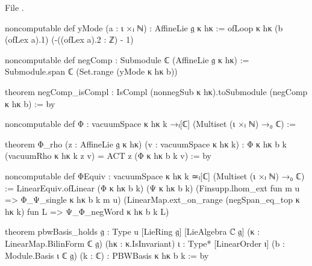File .
\begin{leancode}
noncomputable def yMode (a : ι ×ₗ ℕ) : AffineLie 𝔤 κ hκ :=
  ofLoop κ hκ (b (ofLex a).1) (-((ofLex a).2 : ℤ) - 1)

noncomputable def negComp : Submodule ℂ (AffineLie 𝔤 κ hκ) :=
  Submodule.span ℂ (Set.range (yMode κ hκ b))

theorem negComp_isCompl : IsCompl (nonnegSub κ hκ).toSubmodule (negComp κ hκ b) := by

noncomputable def Φ : vacuumSpace κ hκ k →ₗ[ℂ] (Multiset (ι ×ₗ ℕ) →₀ ℂ) :=

theorem Φ_rho (z : AffineLie 𝔤 κ hκ) (v : vacuumSpace κ hκ k) :
    Φ κ hκ b k (vacuumRho κ hκ k z v) = ACT z (Φ κ hκ b k v) := by

noncomputable def ΦEquiv : vacuumSpace κ hκ k ≃ₗ[ℂ] (Multiset (ι ×ₗ ℕ) →₀ ℂ) :=
  LinearEquiv.ofLinear (Φ κ hκ b k) (Ψ κ hκ b k)
    (Finsupp.lhom_ext fun m u => Φ_Ψ_single κ hκ b k m u)
    (LinearMap.ext_on_range (negSpan_eq_top κ hκ k) fun L => Ψ_Φ_negWord κ hκ b k L)

theorem pbwBasis_holds {𝔤 : Type u} [LieRing 𝔤] [LieAlgebra ℂ 𝔤]
    (κ : LinearMap.BilinForm ℂ 𝔤) (hκ : κ.IsInvariant)
    {ι : Type*} [LinearOrder ι] (b : Module.Basis ι ℂ 𝔤) (k : ℂ) : PBWBasis κ hκ b k := by
\end{leancode}


